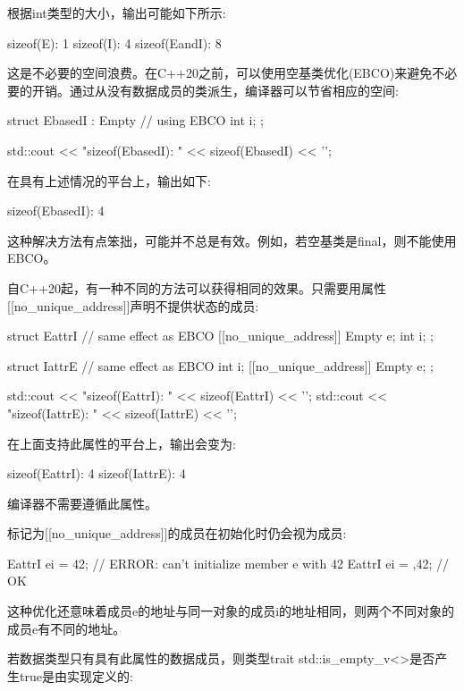 根据int类型的大小，输出可能如下所示:

\begin{shell}
sizeof(E):     1
sizeof(I):     4
sizeof(EandI): 8
\end{shell}

这是不必要的空间浪费。在C++20之前，可以使用空基类优化(EBCO)来避免不必要的开销。通过从没有数据成员的类派生，编译器可以节省相应的空间:

\begin{cpp}
struct EbasedI : Empty { // using EBCO
	int i;
};

std::cout << "sizeof(EbasedI): " << sizeof(EbasedI) << '\n';
\end{cpp}

在具有上述情况的平台上，输出如下:

\begin{shell}
sizeof(EbasedI): 4
\end{shell}

这种解决方法有点笨拙，可能并不总是有效。例如，若空基类是final，则不能使用EBCO。

自C++20起，有一种不同的方法可以获得相同的效果。只需要用属性[[no\_unique\_address]]声明不提供状态的成员:

\begin{cpp}
struct EattrI { // same effect as EBCO
	[[no_unique_address]] Empty e;
	int i;
};

struct IattrE { // same effect as EBCO
	int i;
	[[no_unique_address]] Empty e;
};

std::cout << "sizeof(EattrI): " << sizeof(EattrI) << '\n';
std::cout << "sizeof(IattrE): " << sizeof(IattrE) << '\n';
\end{cpp}

在上面支持此属性的平台上，输出会变为:

\begin{shell}
sizeof(EattrI): 4
sizeof(IattrE): 4
\end{shell}

编译器不需要遵循此属性。

标记为[[no\_unique\_address]]的成员在初始化时仍会视为成员:

\begin{cpp}
EattrI ei = {42}; // ERROR: can’t initialize member e with 42
EattrI ei = {{},42}; // OK
\end{cpp}

这种优化还意味着成员e的地址与同一对象的成员i的地址相同，则两个不同对象的成员e有不同的地址。

若数据类型只有具有此属性的数据成员，则类型trait std::is\_empty\_v<>是否产生true是由实现定义的:

